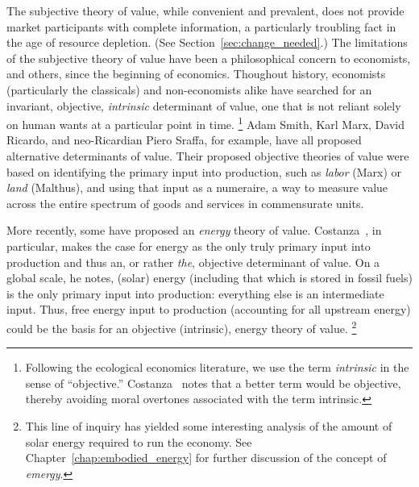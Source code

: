 The subjective theory of value,
while convenient and prevalent, does not
provide market participants with complete information, 
a particularly troubling fact in the age of resource depletion. 
(See Section~\ref{sec:change_needed}.)
The limitations of the subjective theory of value
have been a philosophical concern to 
economists, and others, since the beginning of economics.
Thoughout history, economists (particularly the classicals) 
and non-economists alike have searched for an invariant, objective, 
\emph{intrinsic} determinant of value, one that is not reliant 
solely on human wants at a particular point in time.%
	\footnote{
	Following the ecological economics literature, 
	we use the term \emph{intrinsic} in the sense of ``objective.'' 
	Costanza~\cite{Costanza:2004we} 
	notes that a better term would be objective, thereby avoiding
	moral overtones associated with the term intrinsic.
	} 
Adam Smith, Karl Marx, David Ricardo, and neo-Ricardian Piero Sraffa,
for example, have all proposed 
alternative determinants of value.  
Their proposed objective theories of value were based 
on identifying the primary input into production,
such as \emph{labor} (Marx) or \emph{land} (Malthus), 
and using that input as a numeraire, 
a way to measure value across the entire spectrum 
of goods and services in commensurate units.

More recently, some have proposed an \emph{energy} theory of value. 
Costanza~\cite{Costanza:2004we}, in particular, makes the case for energy 
as the only truly primary input into production 
and thus an, or rather \emph{the}, objective determinant of value. 
On a global scale, he notes, (solar) energy 
(including that which is stored in fossil fuels) is 
the only primary input into production:
everything else is an intermediate input. 
Thus, free energy input to production (accounting for all upstream energy)
could be the basis for an objective (intrinsic), 
energy theory of value.%
	\footnote{
	This line 
	of inquiry has yielded some interesting analysis of the amount 
	of solar energy required to run the economy. 
	See Chapter~\ref{chap:embodied_energy} for further discussion 
	of the concept of \emph{emergy}.
	}

